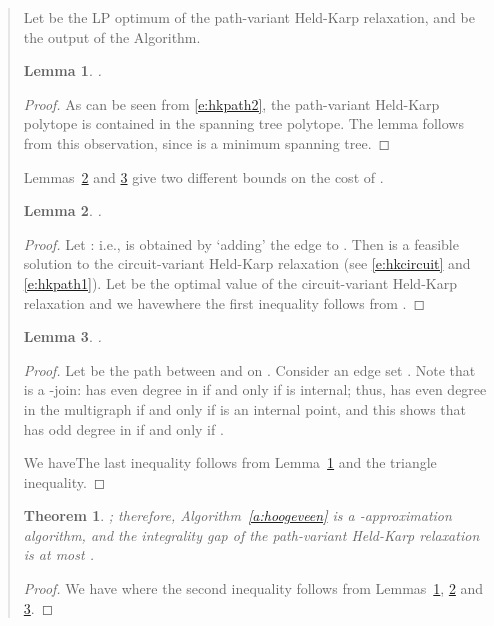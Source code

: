 \documentclass[11pt,letterpaper]{article}
\newtheorem{lemma}{Lemma}
\newtheorem{thm}{Theorem}
\begin{document}
\begin{quote}
Let  be the LP optimum of the path-variant Held-Karp relaxation, and  be the output of the Algorithm.

\begin{lemma}
\label{l:h1}
.
\end{lemma}
\begin{proof}
As can be seen from \eqref{e:hkpath2}, the path-variant Held-Karp polytope is contained in the spanning tree polytope. The lemma follows from this observation, since  is a minimum spanning tree.
\end{proof}

Lemmas~\ref{l:h2} and \ref{l:h3} give two different bounds on the cost of .

\begin{lemma}
\label{l:h2}
.
\end{lemma}
\begin{proof}
Let : i.e.,  is obtained by `adding' the edge  to . Then  is a feasible solution to the circuit-variant Held-Karp relaxation (see \eqref{e:hkcircuit} and \eqref{e:hkpath1}). Let  be the optimal value of the circuit-variant Held-Karp relaxation and we havewhere the first inequality follows from \cite{W, SW}.
\end{proof}

\mbox{}

\begin{lemma}
\label{l:h3}
.
\end{lemma}
\begin{proof}
Let  be the path between  and  on . Consider an edge set . Note that  is a -join:  has even degree in  if and only if  is internal; thus,  has even degree in the multigraph  if and only if  is an internal point, and this shows that  has odd degree in  if and only if .

We haveThe last inequality follows from Lemma~\ref{l:h1} and the triangle inequality.
\end{proof}

\begin{thm}
\label{t:general}
; therefore, Algorithm~\ref{a:hoogeveen} is a -approximation algorithm, and the integrality gap of the path-variant Held-Karp relaxation is at most .
\end{thm}
\begin{proof}
We have
where the second inequality follows from Lemmas~\ref{l:h1}, \ref{l:h2} and \ref{l:h3}.
\end{proof}


\end{quote}
\end{document}
